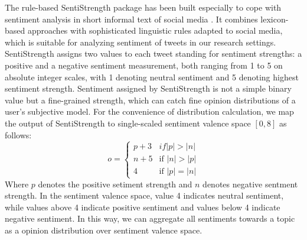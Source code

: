 \documentclass{acm_proc_article-sp}
\begin{document}
The rule-based SentiStrength package has been built especially to cope with sentiment analysis in short informal text of social media \cite{Thelwall:2010SSS}.
It combines lexicon-based approaches with sophisticated linguistic rules adapted to social media, which is suitable for analyzing sentiment of tweets in our research settings.
SentiStrength assigns two values to each tweet standing for sentiment strengths: a positive and a negative sentiment measurement, both ranging from 1 to 5 on absolute integer scales, with 1 denoting neutral sentiment and 5 denoting highest sentiment strength.
Sentiment assigned by SentiStrength is not a simple binary value but a fine-grained strength, which can catch fine opinion distributions of a user's subjective model. 
For the convenience of distribution calculation, we map the output of SentiStrength to single-scaled sentiment valence space $ \left[ 0, 8 \right] $ as follows:
\begin{equation}
\label{opinionmap}
o= \left\{ 
\begin{array}{lll}
{p+3} & if \vert p \vert > \vert n \vert \\
{n+5} & \text{if } \vert n \vert > \vert p \vert \\
{4}  & \text{if } \vert p \vert = \vert n \vert
\end{array}
\right.
\end{equation}
Where $ p $ denotes the positive setiment strength and $ n $ denotes negative sentment strength.
In the sentiment valence space, value 4 indicates neutral sentiment, while values above 4 indicate positive sentiment and values below 4 indicate negative sentiment. In this way, we can aggregate all sentiments towards a topic as a opinion distribution over sentiment valence space.
\end{document}
